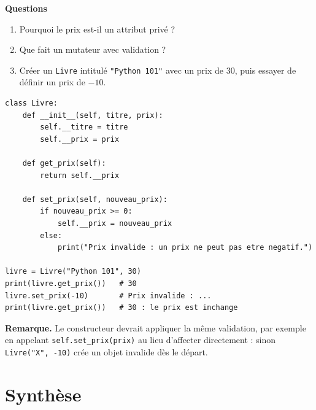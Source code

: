 \documentclass[11pt,a4paper]{article}
\newif\ifcorrige
\newcommand{\py}[1]{\texttt{#1}}
\newcommand{\rep}[1]{%
  \ifcorrige
    \par\smallskip{\color{corr}\small#1}\par\smallskip
  \else
    \par\nobreak\vspace{1mm}\noindent\color{black!55}\dotfill\par
    \noindent\color{black!55}\dotfill\par\color{black}\vspace{1mm}
  \fi}
\newcommand{\zonecode}[1][4cm]{%
  \ifcorrige\else
    \par\smallskip\noindent
    \begin{tcolorbox}[colback=white,colframe=black!45,boxrule=0.5pt,arc=1pt,height=#1]\end{tcolorbox}%
  \fi}
\newenvironment{solution}
  {\ifcorrige
     \begin{tcolorbox}[enhanced,breakable,colback=corrbg,colframe=corr,boxrule=0.6pt,arc=1pt,
       left=5pt,right=5pt,top=4pt,bottom=4pt,
       title={Corrigé},coltitle=corr,fonttitle=\bfseries\small,detach title,
       before upper={\tcbtitle\par\smallskip},fontupper=\small]%
   \else
     \setbox0\vbox\bgroup
   \fi}
  {\ifcorrige\end{tcolorbox}\else\egroup\fi}
\begin{document}
\textbf{Questions}
\begin{enumerate}
  \item Pourquoi le prix est-il un attribut privé ?
    \rep{Parce qu'un prix doit respecter une règle métier : il ne peut pas être négatif. Le
    rendre privé interdit l'écriture directe et oblige à passer par une méthode qui applique
    cette règle.}
  \item Que fait un mutateur avec validation ?
    \rep{Il vérifie la valeur reçue avant de l'affecter à l'attribut. Si la valeur est valide,
    il met l'attribut à jour ; sinon il refuse la modification (message d'erreur ou exception)
    et l'objet conserve son état précédent, qui reste cohérent.}
  \item Créer un \py{Livre} intitulé \py{"Python 101"} avec un prix de 30, puis essayer de
    définir un prix de $-10$.
\end{enumerate}
\zonecode[5.5cm]
\begin{solution}
\begin{lstlisting}
class Livre:
    def __init__(self, titre, prix):
        self.__titre = titre
        self.__prix = prix

    def get_prix(self):
        return self.__prix

    def set_prix(self, nouveau_prix):
        if nouveau_prix >= 0:
            self.__prix = nouveau_prix
        else:
            print("Prix invalide : un prix ne peut pas etre negatif.")

livre = Livre("Python 101", 30)
print(livre.get_prix())   # 30
livre.set_prix(-10)       # Prix invalide : ...
print(livre.get_prix())   # 30 : le prix est inchange
\end{lstlisting}
\textbf{Remarque.} Le constructeur devrait appliquer la même validation, par exemple en
appelant \py{self.set_prix(prix)} au lieu d'affecter directement : sinon
\py{Livre("X", -10)} crée un objet invalide dès le départ.
\end{solution}

\clearpage
\section*{Synthèse}
\end{document}
